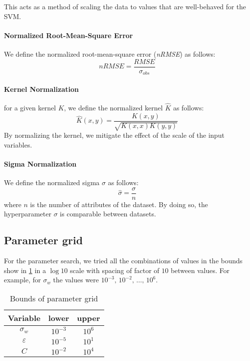 This acts as a method of scaling the data to values that are well-behaved for
the SVM.

\paragraph{Normalized Root-Mean-Square Error} We define the
normalized root-mean-square error (\emph{nRMSE}) as follows:
\begin{equation}
    nRMSE = \frac{RMSE}{\sigma_{obs}}
\end{equation}

\paragraph{Kernel Normalization} for a given kernel $K$, we define the
normalized kernel $\hat{K}$ as follows:
\begin{equation}
    \hat{K}(x, y) = \frac{K(x, y)}{\sqrt{K(x, x)K(y, y)}}
\end{equation}
By normalizing the kernel, we mitigate the effect of the scale of the
input variables. %

\paragraph{Sigma Normalization} We define the normalized sigma $\hat{\sigma}$
as follows:
\begin{equation}
    \hat{\sigma} = \frac{\sigma}{n}
\end{equation}
where $n$ is the number of attributes of the dataset. By doing so, the
hyperparameter $\sigma$ is comparable between datasets.

\subsection{Parameter grid}

For the parameter search, we tried all the combinations of values in the bounds
show in \cref{tab:paramgrid} in a $\log 10$ scale with spacing of factor of $10$
between values. For example, for $\sigma_w$ the values were
$10^{-3},\,10^{-2},\,\dots,\,10^{6}$.

\begin{table}[H]
    \caption{Bounds of parameter grid}%
    \label{tab:paramgrid}
    \begin{tabular}{ccc}
        \toprule
        Variable      & lower     & upper  \\
        \midrule
        $\sigma_w$    & $10^{-3}$ & $10^6$ \\
        $\varepsilon$ & $10^{-5}$ & $10^1$ \\
        $C$           & $10^{-2}$ & $10^4$ \\
        \bottomrule
    \end{tabular}
\end{table}

